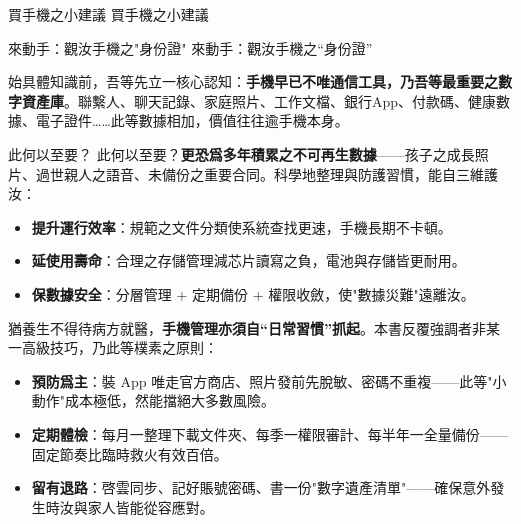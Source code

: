 \begin{tcbinfo}{買手機之小建議}
買手機之小建議

\end{tcbinfo}

\begin{tcbpractice}{來動手：觀汝手機之"身份證"}
來動手：觀汝手機之“身份證”

\end{tcbpractice}


始具體知識前，吾等先立一核心認知：\textbf{手機早已不唯通信工具，乃吾等最重要之數字資產庫}。聯繫人、聊天記錄、家庭照片、工作文檔、銀行App、付款碼、健康數據、電子證件……此等數據相加，價值往往逾手機本身。

\begin{tcbinfo}{此何以至要？}
此何以至要？\textbf{更恐爲多年積累之不可再生數據}——孩子之成長照片、過世親人之語音、未備份之重要合同。科學地整理與防護習慣，能自三維護汝：

\begin{itemize}
  \item \textbf{提升運行效率}：規範之文件分類使系統查找更速，手機長期不卡頓。
  \item \textbf{延使用壽命}：合理之存儲管理減芯片讀寫之負，電池與存儲皆更耐用。
  \item \textbf{保數據安全}：分層管理 + 定期備份 + 權限收斂，使"數據災難"遠離汝。
\end{itemize}

\end{tcbinfo}


猶養生不得待病方就醫，\textbf{手機管理亦須自“日常習慣”抓起}。本書反覆強調者非某一高級技巧，乃此等樸素之原則：

\begin{itemize}
  \item \textbf{預防爲主}：裝 App 唯走官方商店、照片發前先脫敏、密碼不重複——此等"小動作"成本極低，然能擋絕大多數風險。
  \item \textbf{定期體檢}：每月一整理下載文件夾、每季一權限審計、每半年一全量備份——固定節奏比臨時救火有效百倍。
  \item \textbf{留有退路}：啓雲同步、記好賬號密碼、書一份"數字遺產清單"——確保意外發生時汝與家人皆能從容應對。
\end{itemize}
